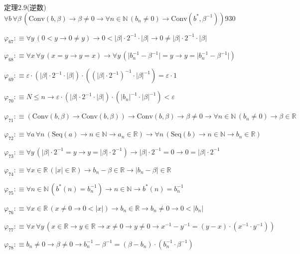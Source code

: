 \begin{fullproof}{定理2.9(逆数)}{$\forall b\,\forall \beta\,(\mathrm{Conv}(b,\beta) \to \beta \neq 0 \to \forall n \in \mathbb{N}\,(b_{n} \neq 0) \to \mathrm{Conv}(b^{\ast},\beta^{-1}))$}{930}
\begin{abbrevlist}
\item $\varphi_{67} :\equiv \forall y\,(0 < y \to 0 \neq y) \to 0 < \lvert \beta \rvert \cdot 2^{-1} \cdot \lvert \beta \rvert \to 0 \neq \lvert \beta \rvert \cdot 2^{-1} \cdot \lvert \beta \rvert$
\item $\varphi_{68} :\equiv \forall x\,\forall y\,(x = y \to y = x) \to \forall y\,(\lvert b_{n}^{-1} - \beta^{-1} \rvert = y \to y = \lvert b_{n}^{-1} - \beta^{-1} \rvert)$
\item $\varphi_{69} :\equiv \varepsilon \cdot (\lvert \beta \rvert \cdot 2^{-1} \cdot \lvert \beta \rvert) \cdot ((\lvert \beta \rvert \cdot 2^{-1})^{-1} \cdot \lvert \beta \rvert^{-1}) = \varepsilon \cdot 1$
\item $\varphi_{70} :\equiv N \leq n \to \varepsilon \cdot (\lvert \beta \rvert \cdot 2^{-1} \cdot \lvert \beta \rvert) \cdot (\lvert b_{n} \rvert^{-1} \cdot \lvert \beta \rvert^{-1}) < \varepsilon$
\item $\varphi_{71} :\equiv (\mathrm{Conv}(b,\beta) \to \mathrm{Conv}(b,\beta)) \to \mathrm{Conv}(b,\beta) \to \beta \neq 0 \to \forall n \in \mathbb{N}\,(b_{n} \neq 0) \to \beta \in \mathbb{R}$
\item $\varphi_{72} :\equiv \forall a\,\forall n\,(\mathrm{Seq}(a) \to n \in \mathbb{N} \to a_{n} \in \mathbb{R}) \to \forall n\,(\mathrm{Seq}(b) \to n \in \mathbb{N} \to b_{n} \in \mathbb{R})$
\item $\varphi_{73} :\equiv \forall y\,(\lvert \beta \rvert \cdot 2^{-1} = y \to y = \lvert \beta \rvert \cdot 2^{-1}) \to \lvert \beta \rvert \cdot 2^{-1} = 0 \to 0 = \lvert \beta \rvert \cdot 2^{-1}$
\item $\varphi_{74} :\equiv \forall x \in \mathbb{R}\,(\lvert x \rvert \in \mathbb{R}) \to b_{n} - \beta \in \mathbb{R} \to \lvert b_{n} - \beta \rvert \in \mathbb{R}$
\item $\varphi_{75} :\equiv \forall n \in \mathbb{N}\,(b^{\ast}(n) = b_{n}^{-1}) \to n \in \mathbb{N} \to b^{\ast}(n) = b_{n}^{-1}$
\item $\varphi_{76} :\equiv \forall x \in \mathbb{R}\,(x \neq 0 \to 0 < \lvert x \rvert) \to b_{n} \in \mathbb{R} \to b_{n} \neq 0 \to 0 < \lvert b_{n} \rvert$
\item $\varphi_{77} :\equiv \forall x\,\forall y\,(x \in \mathbb{R} \to y \in \mathbb{R} \to x \neq 0 \to y \neq 0 \to x^{-1} - y^{-1} = (y - x) \cdot (x^{-1} \cdot y^{-1}))$
\item $\varphi_{78} :\equiv b_{n} \neq 0 \to \beta \neq 0 \to b_{n}^{-1} - \beta^{-1} = (\beta - b_{n}) \cdot (b_{n}^{-1} \cdot \beta^{-1})$

\end{abbrevlist}
\end{fullproof}
